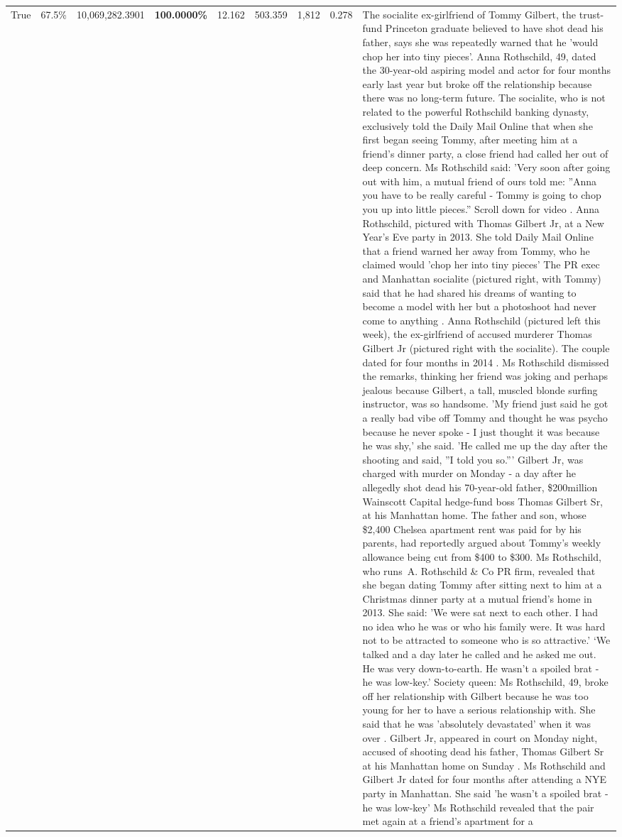 \begin{table}[H]
\begin{tabular}{lllrlllll}
True & 67.5\% & 10,069,282.3901 & \bfseries \color{red} 100.0000\% & 12.162 & 503.359 & 1,812 & 0.278 & The socialite ex-girlfriend of Tommy Gilbert, the trust-fund Princeton graduate believed to have shot dead his father, says she was repeatedly warned that he 'would chop her into tiny pieces'. Anna Rothschild, 49, dated the 30-year-old aspiring model and actor for four months early last year but broke off the relationship because there was no long-term future. The socialite, who is not related to the powerful Rothschild banking dynasty, exclusively told the Daily Mail Online that when she first began seeing Tommy, after meeting him at a friend's dinner party, a close friend had called her out of deep concern. Ms Rothschild said: 'Very soon after going out with him, a mutual friend of ours told me: ''Anna you have to be really careful - Tommy is going to chop you up into little pieces.'' Scroll down for video . Anna Rothschild, pictured with Thomas Gilbert Jr, at a New Year's Eve party in 2013. She told Daily Mail Online that a friend warned her away from Tommy, who he claimed would 'chop her into tiny pieces' The PR exec and Manhattan socialite (pictured right, with Tommy) said that he had shared his dreams of wanting to become a model with her but a photoshoot had never come to anything . Anna Rothschild (pictured left this week), the ex-girlfriend of accused murderer Thomas Gilbert Jr (pictured right with the socialite). The couple dated for four months in 2014 . Ms Rothschild dismissed the remarks, thinking her friend was joking and perhaps jealous because Gilbert, a tall, muscled blonde surfing instructor, was so handsome. 'My friend just said he got a really bad vibe off Tommy and thought he was psycho because he never spoke - I just thought it was because he was shy,' she said. 'He called me up the day after the shooting and said, ''I told you so.''' Gilbert Jr, was charged with murder on Monday - a day after he allegedly shot dead his 70-year-old father, \$200million Wainscott Capital hedge-fund boss Thomas Gilbert Sr, at his Manhattan home. The father and son, whose \$2,400 Chelsea apartment rent was paid for by his parents, had reportedly argued about Tommy's weekly allowance being cut from \$400 to \$300. Ms Rothschild, who runs A. Rothschild \& Co PR firm, revealed that she began dating Tommy after sitting next to him at a Christmas dinner party at a mutual friend's home in 2013. She said: 'We were sat next to each other. I had no idea who he was or who his family were. It was hard not to be attracted to someone who is so attractive.' ‘We talked and a day later he called and he asked me out. He was very down-to-earth. He wasn’t a spoiled brat - he was low-key.’ Society queen: Ms Rothschild, 49, broke off her relationship with Gilbert because he was too young for her to have a serious relationship with. She said that he was 'absolutely devastated' when it was over . Gilbert Jr, appeared in court on Monday night, accused of shooting dead his father, Thomas Gilbert Sr at his Manhattan home on Sunday . Ms Rothschild and Gilbert Jr dated for four months after attending a NYE party in Manhattan. She said 'he wasn't a spoiled brat - he was low-key' Ms Rothschild revealed that the pair met again at a friend’s apartment for a 
\end{tabular}
\end{table}
